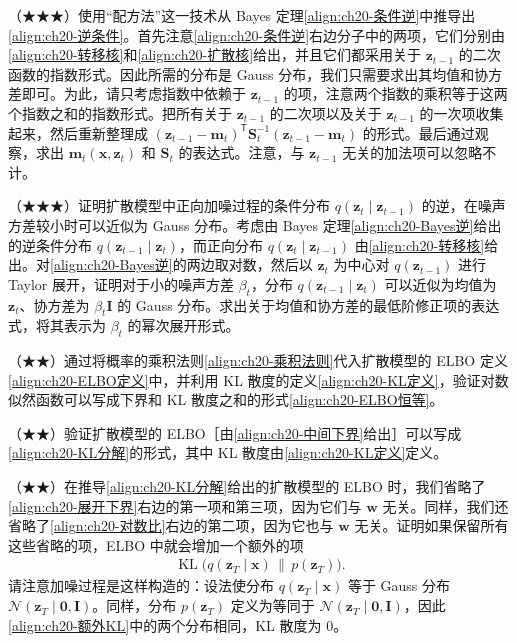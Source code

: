 \documentclass[../../main.tex]{subfiles}
\begin{document}
\begin{exercise}\label{exercise:ch20-06}
（★★★）使用“配方法”这一技术从 Bayes 定理\eqref{align:ch20-条件逆}中推导出\eqref{align:ch20-逆条件}。首先注意\eqref{align:ch20-条件逆}右边分子中的两项，它们分别由\eqref{align:ch20-转移核}和\eqref{align:ch20-扩散核}给出，并且它们都采用关于 $\bm{z}_{t-1}$ 的二次函数的指数形式。因此所需的分布是 Gauss 分布，我们只需要求出其均值和协方差即可。为此，请只考虑指数中依赖于 $\bm{z}_{t-1}$ 的项，注意两个指数的乘积等于这两个指数之和的指数形式。把所有关于 $\bm{z}_{t-1}$ 的二次项以及关于 $\bm{z}_{t-1}$ 的一次项收集起来，然后重新整理成 $(\bm{z}_{t-1}-\bm{m}_t)^{\mathsf T}\bm{S}_t^{-1}(\bm{z}_{t-1}-\bm{m}_t)$ 的形式。最后通过观察，求出 $\bm{m}_t(\bm{x},\bm{z}_t)$ 和 $\bm{S}_t$ 的表达式。注意，与 $\bm{z}_{t-1}$ 无关的加法项可以忽略不计。
\end{exercise}

\begin{exercise}\label{exercise:ch20-07}
（★★★）证明扩散模型中正向加噪过程的条件分布 $q(\bm{z}_t\mid\bm{z}_{t-1})$ 的逆，在噪声方差较小时可以近似为 Gauss 分布。考虑由 Bayes 定理\eqref{align:ch20-Bayes逆}给出的逆条件分布 $q(\bm{z}_{t-1}\mid\bm{z}_t)$，而正向分布 $q(\bm{z}_t\mid\bm{z}_{t-1})$ 由\eqref{align:ch20-转移核}给出。对\eqref{align:ch20-Bayes逆}的两边取对数，然后以 $\bm{z}_t$ 为中心对 $q(\bm{z}_{t-1})$ 进行 Taylor 展开，证明对于小的噪声方差 $\beta_t$，分布 $q(\bm{z}_{t-1}\mid\bm{z}_t)$ 可以近似为均值为 $\bm{z}_t$、协方差为 $\beta_t\bm{I}$ 的 Gauss 分布。求出关于均值和协方差的最低阶修正项的表达式，将其表示为 $\beta_t$ 的幂次展开形式。
\end{exercise}

\begin{exercise}\label{exercise:ch20-08}
（★★）通过将概率的乘积法则\eqref{align:ch20-乘积法则}代入扩散模型的 ELBO 定义\eqref{align:ch20-ELBO定义}中，并利用 KL 散度的定义\eqref{align:ch20-KL定义}，验证对数似然函数可以写成下界和 KL 散度之和的形式\eqref{align:ch20-ELBO恒等}。
\end{exercise}

\begin{exercise}\label{exercise:ch20-09}
（★★）验证扩散模型的 ELBO［由\eqref{align:ch20-中间下界}给出］可以写成\eqref{align:ch20-KL分解}的形式，其中 KL 散度由\eqref{align:ch20-KL定义}定义。
\end{exercise}

\begin{exercise}\label{exercise:ch20-10}
（★★）在推导\eqref{align:ch20-KL分解}给出的扩散模型的 ELBO 时，我们省略了\eqref{align:ch20-展开下界}右边的第一项和第三项，因为它们与 $\bm{w}$ 无关。同样，我们还省略了\eqref{align:ch20-对数比}右边的第二项，因为它也与 $\bm{w}$ 无关。证明如果保留所有这些省略的项，ELBO 中就会增加一个额外的项
\begin{align}
\operatorname{KL}\big(q(\bm{z}_T\mid\bm{x})\,\|\,p(\bm{z}_T)\big).
\label{align:ch20-额外KL}
\end{align}
请注意加噪过程是这样构造的：设法使分布 $q(\bm{z}_T\mid\bm{x})$ 等于 Gauss 分布 $\mathcal{N}(\bm{z}_T\mid\bm{0},\bm{I})$。同样，分布 $p(\bm{z}_T)$ 定义为等同于 $\mathcal{N}(\bm{z}_T\mid\bm{0},\bm{I})$，因此\eqref{align:ch20-额外KL}中的两个分布相同，KL 散度为 $0$。
\end{exercise}
\end{document}

